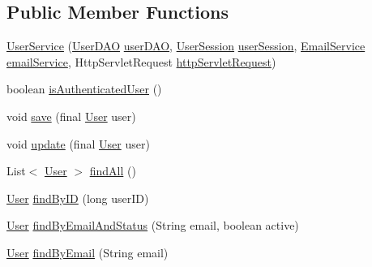 \subsection*{Public Member Functions}
\begin{DoxyCompactItemize}
\item 
\hyperlink{classbr_1_1usp_1_1cata_1_1service_1_1_user_service_a00bcc0d964c883de83f9dc81397fa7b6}{User\+Service} (\hyperlink{classbr_1_1usp_1_1cata_1_1dao_1_1_user_d_a_o}{User\+D\+A\+O} \hyperlink{classbr_1_1usp_1_1cata_1_1service_1_1_user_service_a9b0f4eea06df1452846855d39518849a}{user\+D\+A\+O}, \hyperlink{classbr_1_1usp_1_1cata_1_1web_1_1controller_1_1_user_session}{User\+Session} \hyperlink{classbr_1_1usp_1_1cata_1_1service_1_1_user_service_a187626d53b70452a3a3d555a0caf8895}{user\+Session}, \hyperlink{classbr_1_1usp_1_1cata_1_1service_1_1_email_service}{Email\+Service} \hyperlink{classbr_1_1usp_1_1cata_1_1service_1_1_user_service_a9858ac8baef281632344214e6ff02a39}{email\+Service}, Http\+Servlet\+Request \hyperlink{classbr_1_1usp_1_1cata_1_1service_1_1_user_service_aab26805de06112377424767db85bdced}{http\+Servlet\+Request})
\item 
boolean \hyperlink{classbr_1_1usp_1_1cata_1_1service_1_1_user_service_afa7f60fb51c66deb3f1f81839e5079b5}{is\+Authenticated\+User} ()
\item 
void \hyperlink{classbr_1_1usp_1_1cata_1_1service_1_1_user_service_a42baf3e98d617493305c2fb9c017e3ed}{save} (final \hyperlink{classbr_1_1usp_1_1cata_1_1model_1_1_user}{User} user)
\item 
void \hyperlink{classbr_1_1usp_1_1cata_1_1service_1_1_user_service_a9f26c7628a903bd44f1c4f3fc324c93d}{update} (final \hyperlink{classbr_1_1usp_1_1cata_1_1model_1_1_user}{User} user)
\item 
List$<$ \hyperlink{classbr_1_1usp_1_1cata_1_1model_1_1_user}{User} $>$ \hyperlink{classbr_1_1usp_1_1cata_1_1service_1_1_user_service_a228d0ab8d8ad8d00e39acad7df36b928}{find\+All} ()
\item 
\hyperlink{classbr_1_1usp_1_1cata_1_1model_1_1_user}{User} \hyperlink{classbr_1_1usp_1_1cata_1_1service_1_1_user_service_a60776aa226a2c44ed066bf9c3dade43b}{find\+By\+I\+D} (long user\+I\+D)
\item 
\hyperlink{classbr_1_1usp_1_1cata_1_1model_1_1_user}{User} \hyperlink{classbr_1_1usp_1_1cata_1_1service_1_1_user_service_a54546634f08d20bb3e7d48a4947f9baf}{find\+By\+Email\+And\+Status} (String email, boolean active)
\item 
\hyperlink{classbr_1_1usp_1_1cata_1_1model_1_1_user}{User} \hyperlink{classbr_1_1usp_1_1cata_1_1service_1_1_user_service_a72f4a3a0ebb12d2cb7ee5048e9d1f41c}{find\+By\+Email} (String email)

\end{DoxyCompactItemize}
